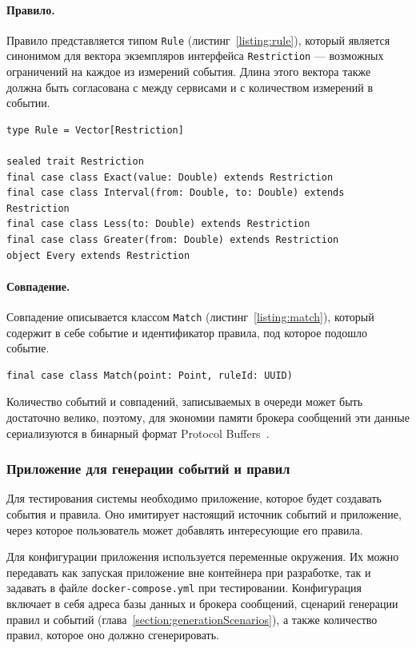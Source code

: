\documentclass[14pt]{article}
\begin{document}
\paragraph{Правило.} 
Правило представляется типом \verb|Rule| (листинг~\ref{listing:rule}), который является синонимом для вектора экземпляров интерфейса \verb|Restriction| --- возможных ограничений на каждое из измерений события. Длина этого вектора также должна быть согласована с между сервисами и с количеством измерений в событии.

\begin{lstlisting}[style=scalaStyle,caption={Тип, описывающий правило.},label={listing:rule},captionpos=b, float]
type Rule = Vector[Restriction]

sealed trait Restriction
final case class Exact(value: Double) extends Restriction
final case class Interval(from: Double, to: Double) extends Restriction
final case class Less(to: Double) extends Restriction 
final case class Greater(from: Double) extends Restriction 
object Every extends Restriction 
\end{lstlisting}

\paragraph{Совпадение.} Совпадение описывается классом \verb|Match| (листинг~\ref{listing:match}), который содержит в себе событие и идентификатор правила, под которое подошло событие.
\begin{lstlisting}[style=scalaStyle,caption={Класс, описывающий совпадение.},label={listing:match},captionpos=b, float]
final case class Match(point: Point, ruleId: UUID)
\end{lstlisting}

Количество событий и совпадений, записываемых в очереди может быть достаточно велико, поэтому, для экономии памяти брокера сообщений эти данные сериализуются в бинарный формат Protocol Buffers~\cite{protobuf}.

\subsubsection{Приложение для генерации событий и правил}
Для тестирования системы необходимо приложение, которое будет создавать события и правила. Оно имитирует настоящий источник событий и приложение, через которое пользователь может добавлять интересующие его правила.

Для конфигурации приложения используется переменные окружения. Их можно передавать как запуская приложение вне контейнера при разработке, так и задавать в файле \verb|docker-compose.yml| при тестировании. Конфигурация включает в себя адреса базы данных и брокера сообщений, сценарий генерации правил и событий (глава~\ref{section:generationScenarios}), а также количество правил, которое оно должно сгенерировать.
\end{document}
